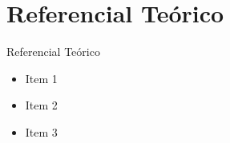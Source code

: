 \AtBeginSection[]{
	\begin{frame}
		\frametitle{}
		\tableofcontents[currentsection]
	\end{frame}
}

\section{Referencial Teórico}
\begin{frame}{Referencial Teórico}
	\begin{itemize}[<+->]
		\item Item 1
		\item Item 2
		\item Item 3
	\end{itemize}
\end{frame}